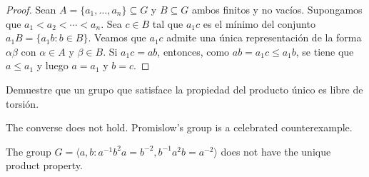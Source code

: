 \begin{proof}
	Sean $A=\{a_1,\dots,a_n\}\subseteq G$ y $B\subseteq G$ ambos finitos y no
	vacíos. Supongamos que $a_1<a_2<\cdots<a_n$. Sea $c\in B$ tal que $a_1c$ es
	el mínimo del conjunto $a_1B=\{a_1b:b\in B\}$. Veamos que $a_1c$ admite una
	única representación de la forma $\alpha\beta$ con $\alpha\in A$ y
	$\beta\in B$. Si $a_1c=ab$, entonces, como $ab=a_1c\leq a_1b$, se tiene que
	$a\leq a_1$ y luego $a=a_1$ y $b=c$. 
\end{proof}

\begin{exercise}
	Demuestre que un grupo que satisface la propiedad del producto único es
	libre de torsión.
\end{exercise}

The converse does not hold. 
Promislow's group is a celebrated counterexample.

\begin{theorem}[Promislow]
    The 
    group $G=\langle a,b:a^{-1}b^2a=b^{-2},b^{-1}a^2b=a^{-2}\rangle$
    does not have the unique product property.
\end{theorem}

